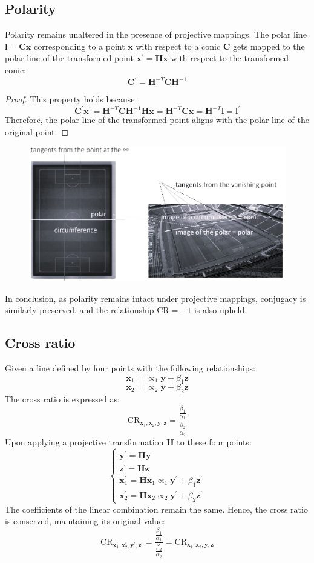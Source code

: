 \subsection{Polarity}
Polarity remains unaltered in the presence of projective mappings.
The polar line $\mathbf{l}=\mathbf{Cx}$ corresponding to a point $\mathbf{x}$ with respect to a conic $\mathbf{C}$ gets mapped to the polar line of the transformed point $\mathbf{x}^\prime = \mathbf{Hx}$ with respect to the transformed conic:
\[\mathbf{C}^\prime=\mathbf{H}^{-T}\mathbf{CH}^{-1}\]
\begin{proof}
    This property holds because:
    \[\mathbf{C}^\prime \mathbf{x}^\prime=\mathbf{H}^{-T}\mathbf{CH}^{-1}\mathbf{Hx}=\mathbf{H}^{-T}\mathbf{Cx}=\mathbf{H}^{-T}\mathbf{l}=\mathbf{l}^\prime\]
    Therefore, the polar line of the transformed point aligns with the polar line of the original point.
\end{proof}
\begin{figure}[H]
    \centering
    \includegraphics[width=0.75\linewidth]{images/polarity.png}
\end{figure}
In conclusion, as polarity remains intact under projective mappings, conjugacy is similarly preserved, and the relationship $\text{CR}=-1$ is also upheld.

\subsection{Cross ratio}
Given a line defined by four points with the following relationships:
\[\mathbf{x}_1=\propto_1\mathbf{y}+\beta_1\mathbf{z}\]
\[\mathbf{x}_2=\propto_2\mathbf{y}+\beta_2\mathbf{z}\]
The cross ratio is expressed as:
\[\text{CR}_{\mathbf{x}_1,\mathbf{x}_2,\mathbf{y},\mathbf{z}}=\dfrac{\frac{\beta_1}{\alpha_1}}{\frac{\beta_2}{\alpha_2}}\]
Upon applying a projective transformation $\mathbf{H}$ to these four points:
\[\begin{cases}
    \mathbf{y}^\prime=\mathbf{Hy} \\
    \mathbf{z}^\prime=\mathbf{Hz} \\ 
    \mathbf{x}^\prime_1=\mathbf{H}\mathbf{x}_1\propto_1\mathbf{y}^\prime+\beta_1\mathbf{z}^\prime \\
    \mathbf{x}^\prime_2=\mathbf{H}\mathbf{x}_2\propto_2\mathbf{y}^\prime+\beta_2\mathbf{z}^\prime
\end{cases}\]
The coefficients of the linear combination remain the same. 
Hence, the cross ratio is conserved, maintaining its original value:
\[\text{CR}_{\mathbf{x}_1^\prime,\mathbf{x}_2^\prime,\mathbf{y}^\prime,\mathbf{z}^\prime}=\dfrac{\frac{\beta_1}{\alpha_1}}{\frac{\beta_2}{\alpha_2}}=\text{CR}_{\mathbf{x}_1,\mathbf{x}_2,\mathbf{y},\mathbf{z}}\]

